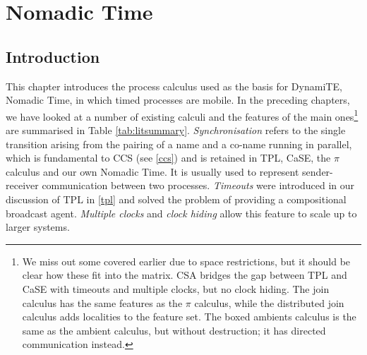 
\chapter{Nomadic Time}
\label{nt}

\section{Introduction}

This chapter introduces the process calculus used as the basis for
DynamiTE, Nomadic Time, in which timed processes are mobile.  In the
preceding chapters, we have looked at a number of existing calculi and
the features of the main ones\footnote{We miss out some covered
  earlier due to space restrictions, but it should be clear how these
  fit into the matrix.  CSA bridges the gap between TPL and CaSE with
  timeouts and multiple clocks, but no clock hiding.  The join
  calculus has the same features as the $\pi$ calculus, while the
  distributed join calculus adds localities to the feature set.  The
  boxed ambients calculus is the same as the ambient calculus, but
  without destruction; it has directed communication instead.} are
summarised in Table \ref{tab:litsummary}.  \emph{Synchronisation}
refers to the single transition arising from the pairing of a name and
a co-name running in parallel, which is fundamental to CCS (see
\ref{ccs}) and is retained in TPL, CaSE, the $\pi$ calculus and our
own Nomadic Time.  It is usually used to represent sender-receiver
communication between two processes.  \emph{Timeouts} were introduced
in our discussion of TPL in \ref{tpl} and solved the problem of
providing a compositional broadcast agent.  \emph{Multiple clocks} and
\emph{clock hiding} allow this feature to scale up to larger systems.

